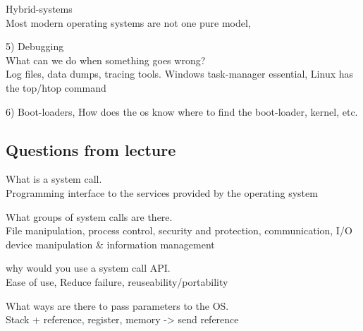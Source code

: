 \documentclass[a4paper,10pt,titlepage]{report}
\begin{document}
\hspace{10mm}    Hybrid-systems \\
\hspace{15mm} Most modern operating systems are not one pure model, 



\vspace{5mm}


5)
Debugging\\
\hspace{10mm}What can we do when something goes wrong? \\
\hspace{15mm}	Log files, data dumps, tracing tools. Windows task-manager essential, Linux has the top/htop command \\

\vspace{5mm}


6)
Boot-loaders, How does the os know where to find the boot-loader, kernel, etc. \\




\subsection{Questions from lecture}
What is a system call.\\
\hspace{10mm} Programming interface to the services provided by the operating system \\ \vspace{5mm}


What groups of system calls are there. \\
\hspace{10mm}File manipulation, process control, security and protection, communication, I/O device manipulation \& information management\\ \vspace{5mm}


why would you use a system call API.\\
\hspace{10mm}Ease of use, Reduce failure, reuseability/portability \\ \vspace{5mm}


What ways are there to pass parameters to the OS.\\
\hspace{10mm} Stack + reference, register, memory -> send reference \\  \vspace{5mm}
\end{document}
